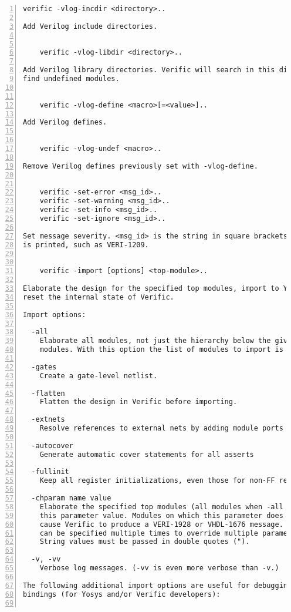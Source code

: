 \begin{lstlisting}[numbers=left,frame=single]
    verific -vlog-incdir <directory>..

Add Verilog include directories.


    verific -vlog-libdir <directory>..

Add Verilog library directories. Verific will search in this directories to
find undefined modules.


    verific -vlog-define <macro>[=<value>]..

Add Verilog defines.


    verific -vlog-undef <macro>..

Remove Verilog defines previously set with -vlog-define.


    verific -set-error <msg_id>..
    verific -set-warning <msg_id>..
    verific -set-info <msg_id>..
    verific -set-ignore <msg_id>..

Set message severity. <msg_id> is the string in square brackets when a message
is printed, such as VERI-1209.


    verific -import [options] <top-module>..

Elaborate the design for the specified top modules, import to Yosys and
reset the internal state of Verific.

Import options:

  -all
    Elaborate all modules, not just the hierarchy below the given top
    modules. With this option the list of modules to import is optional.

  -gates
    Create a gate-level netlist.

  -flatten
    Flatten the design in Verific before importing.

  -extnets
    Resolve references to external nets by adding module ports as needed.

  -autocover
    Generate automatic cover statements for all asserts

  -fullinit
    Keep all register initializations, even those for non-FF registers.

  -chparam name value 
    Elaborate the specified top modules (all modules when -all given) using
    this parameter value. Modules on which this parameter does not exist will
    cause Verific to produce a VERI-1928 or VHDL-1676 message. This option
    can be specified multiple times to override multiple parameters.
    String values must be passed in double quotes (").

  -v, -vv
    Verbose log messages. (-vv is even more verbose than -v.)

The following additional import options are useful for debugging the Verific
bindings (for Yosys and/or Verific developers):


\end{lstlisting}

